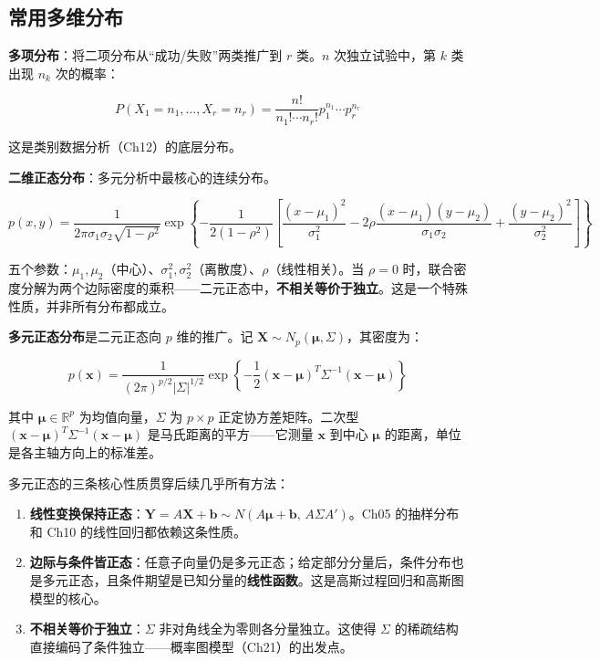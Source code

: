 \documentclass[
]{book}
\providecommand{\tightlist}{%
  \setlength{\itemsep}{0pt}\setlength{\parskip}{0pt}}
\begin{document}
\subsection{常用多维分布}\label{ux5e38ux7528ux591aux7ef4ux5206ux5e03}

\textbf{多项分布}：将二项分布从``成功/失败''两类推广到 \(r\) 类。\(n\) 次独立试验中，第 \(k\) 类出现 \(n_k\) 次的概率：

\[P(X_1=n_1,\ldots,X_r=n_r) = \frac{n!}{n_1! \cdots n_r!} p_1^{n_1} \cdots p_r^{n_r}\]

这是类别数据分析（Ch12）的底层分布。

\textbf{二维正态分布}：多元分析中最核心的连续分布。

\[p(x,y) = \frac{1}{2\pi\sigma_1\sigma_2\sqrt{1-\rho^2}} \exp\left\{ -\frac{1}{2(1-\rho^2)} \left[ \frac{(x-\mu_1)^2}{\sigma_1^2} - 2\rho\frac{(x-\mu_1)(y-\mu_2)}{\sigma_1\sigma_2} + \frac{(y-\mu_2)^2}{\sigma_2^2} \right] \right\}\]

五个参数：\(\mu_1, \mu_2\)（中心）、\(\sigma_1^2, \sigma_2^2\)（离散度）、\(\rho\)（线性相关）。当 \(\rho = 0\) 时，联合密度分解为两个边际密度的乘积------二元正态中，\textbf{不相关等价于独立}。这是一个特殊性质，并非所有分布都成立。

\textbf{多元正态分布}是二元正态向 \(p\) 维的推广。记 \(\mathbf{X} \sim N_p(\boldsymbol{\mu}, \Sigma)\)，其密度为：

\[p(\mathbf{x}) = \frac{1}{(2\pi)^{p/2} |\Sigma|^{1/2}} \exp\left\{ -\frac{1}{2}(\mathbf{x} - \boldsymbol{\mu})^T \Sigma^{-1} (\mathbf{x} - \boldsymbol{\mu}) \right\}\]

其中 \(\boldsymbol{\mu} \in \mathbb{R}^p\) 为均值向量，\(\Sigma\) 为 \(p \times p\) 正定协方差矩阵。二次型 \((\mathbf{x} - \boldsymbol{\mu})^T \Sigma^{-1} (\mathbf{x} - \boldsymbol{\mu})\) 是马氏距离的平方------它测量 \(\mathbf{x}\) 到中心 \(\boldsymbol{\mu}\) 的距离，单位是各主轴方向上的标准差。

多元正态的三条核心性质贯穿后续几乎所有方法：

\begin{enumerate}
\def\labelenumi{\arabic{enumi}.}
\tightlist
\item
  \textbf{线性变换保持正态}：\(\mathbf{Y} = A\mathbf{X} + \mathbf{b} \sim N(A\boldsymbol{\mu} + \mathbf{b},\, A\Sigma A')\)。Ch05 的抽样分布和 Ch10 的线性回归都依赖这条性质。
\item
  \textbf{边际与条件皆正态}：任意子向量仍是多元正态；给定部分分量后，条件分布也是多元正态，且条件期望是已知分量的\textbf{线性函数}。这是高斯过程回归和高斯图模型的核心。
\item
  \textbf{不相关等价于独立}：\(\Sigma\) 非对角线全为零则各分量独立。这使得 \(\Sigma\) 的稀疏结构直接编码了条件独立------概率图模型（Ch21）的出发点。
\end{enumerate}
\end{document}
